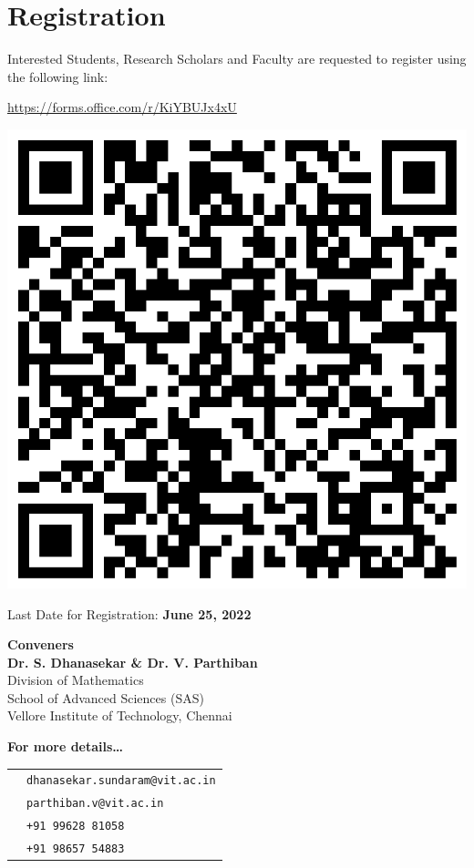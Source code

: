 \section{Registration}
Interested Students, Research Scholars and Faculty are requested to register using the following link:

\begin{center}
	\textcolor{Maroon}{
		\large 
		\url{https://forms.office.com/r/KiYBUJx4xU}
	}
	
	\includegraphics[width=.5\textwidth]{img/qr}
\end{center}



Last Date for Registration: \textcolor{primaryColor}{\large \textbf{June 25, 2022}}

\begin{center}
	\textcolor{primaryColor}{\Large \textbf{Conveners}}\\[.5\baselineskip]
	\textbf{\textcolor{secondaryColor}{Dr. S. Dhanasekar \& Dr. V. Parthiban}}\\
	Division of Mathematics\\
	School of Advanced Sciences (SAS)\\
	Vellore Institute of Technology, Chennai
\end{center}

\begin{snugshade}
\vspace{\baselineskip}
		\begin{center}
\textcolor{primaryColor}{\Large \textbf{For more details\dots}}\\[.5\baselineskip]
		\begin{tabular}{cp{}}
			\textcolor{primaryColor}{\faEnvelope} & \texttt{dhanasekar.sundaram@vit.ac.in} \\
			& \texttt{parthiban.v@vit.ac.in} \\
			\textcolor{primaryColor}{\faPhone} & \texttt{+91 99628 81058}\\
			& \texttt{+91 98657 54883}\\
			
		\end{tabular}
	\end{center}
	\vspace{\baselineskip}
\end{snugshade}




